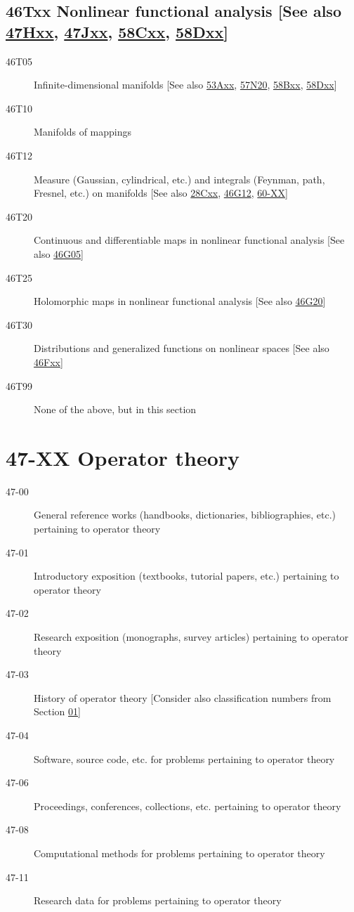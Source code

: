 \subsection*{46Txx  Nonlinear functional analysis [See also \hyperref[47Hxx]{47Hxx}, \hyperref[47Jxx]{47Jxx}, \hyperref[58Cxx]{58Cxx}, \hyperref[58Dxx]{58Dxx}] }\label{46Txx}
\begin{description}  
\item [46T05]\label{46T05} Infinite-dimensional manifolds [See also \hyperref[53Axx]{53Axx}, \hyperref[57N20]{57N20}, \hyperref[58Bxx]{58Bxx}, \hyperref[58Dxx]{58Dxx}]
\item [46T10]\label{46T10} Manifolds of mappings
\item [46T12]\label{46T12} Measure (Gaussian, cylindrical, etc.) and integrals (Feynman, path, Fresnel, etc.) on manifolds [See also \hyperref[28Cxx]{28Cxx}, \hyperref[46G12]{46G12}, \hyperref[60-XX]{60-XX}]
\item [46T20]\label{46T20} Continuous and differentiable maps in nonlinear functional analysis [See also \hyperref[46G05]{46G05}]
\item [46T25]\label{46T25} Holomorphic maps in nonlinear functional analysis [See also \hyperref[46G20]{46G20}]
\item [46T30]\label{46T30} Distributions and generalized functions on nonlinear spaces [See also \hyperref[46Fxx]{46Fxx}]
\item [46T99]\label{46T99} None of the above, but in this section
\end{description}
\section*{47-XX Operator theory }\label{47-XX}
\begin{description}
\item [47-00]\label{47-00} General reference works (handbooks, dictionaries, bibliographies, etc.) pertaining to operator theory
\item [47-01]\label{47-01} Introductory exposition (textbooks, tutorial papers, etc.) pertaining to operator theory
\item [47-02]\label{47-02} Research exposition (monographs, survey articles) pertaining to operator theory
\item [47-03]\label{47-03} History of operator theory [Consider also classification numbers from Section \hyperref[01-XX]{01}]
\item [47-04]\label{47-04} Software, source code, etc. for problems pertaining to operator theory
\item [47-06]\label{47-06} Proceedings, conferences, collections, etc. pertaining to operator theory
\item [47-08]\label{47-08} Computational methods for problems pertaining to operator theory
\item [47-11]\label{47-11} Research data for problems pertaining to operator theory
\end{description}

